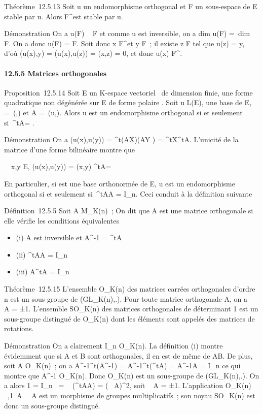 \documentclass[]{article}
\begin{document}
Théorème~12.5.13 Soit u un endomorphisme orthogonal et F un sous-espace
de E stable par u. Alors F^\bot est stable par u.

Démonstration On a u(F) \subset~ F et comme u est inversible, on a
dim u(F) =\ dim~ F. On
a donc u(F) = F. Soit donc x \in F^\bot et y \in F~; il existe z \in F
tel que u(z) = y, d'où \phi(u(x),y) = \phi(u(x),u(z)) = \phi(x,z) = 0, et donc
u(x) \in F^\bot.

\paragraph{12.5.5 Matrices orthogonales}

Proposition~12.5.14 Soit E un K-espace vectoriel ~de dimension finie, \Phi
une forme quadratique non dégénérée sur E de forme polaire \phi. Soit u \in
L(E),  une base de E, \Omega =\
\mathrmMat (\phi,) et A =\
\mathrmMat (u,). Alors u est un endomorphisme
orthogonal si et seulement si~^tA\OmegaA = \Omega.

Démonstration On a \phi(u(x),u(y)) = ^t(AX)\Omega(AY ) =
^tX^tA\OmegaAY . L'unicité de la matrice d'une forme
bilinéaire montre que

\forall~~x,y \in E, \phi(u(x),u(y)) = \phi(x,y)
\Leftrightarrow ^tA\OmegaA = \Omega

En particulier, si  est une base orthonormée de E, u est un
endomorphisme orthogonal si et seulement si~^tAA =
I_n. Ceci conduit à la définition suivante

Définition~12.5.5 Soit A \in M_K(n)~; On dit que A est une
matrice orthogonale si elle vérifie les conditions équivalentes

\begin{itemize}
\itemsep1pt\parskip0pt
\item
  (i) A est inversible et A^-1 = ^tA
\item
  (ii) ^tAA = I_n
\item
  (iii) A^tA = I_n
\end{itemize}

Théorème~12.5.15 L'ensemble O_K(n) des matrices carrées
orthogonales d'ordre n est un sous groupe de (GL_K(n),.). Pour
toute matrice orthogonale A, on a
\mathrm{det}~ A = ±1.
L'ensemble SO_K(n) des matrices orthogonales de déterminant 1
est un sous-groupe distingué de O_K(n) dont les éléments sont
appelés des matrices de rotations.

Démonstration On a clairement I_n \in O_K(n). La
définition (i) montre évidemment que si A et B sont orthogonales, il en
est de même de AB. De plus, soit A \in O_K(n)~; on a
A^-1^t(A^-1) =
A^-1^t(^tA) = A^-1A =
I_n ce qui montre que A^-1 \in O_K(n). Donc
O_K(n) est un sous-groupe de (GL_K(n),.). On a alors 1
=  I_n~
= ~
(^tAA) =
(~
A)^2, soit
~ A = ±1.
L'application O_K(n) \rightarrow~,1\,
A\mapsto~\mathrm{det}~
A est un morphisme de groupes multiplicatifs~; son noyau
SO_K(n) est donc un sous-groupe distingué.
\end{document}
